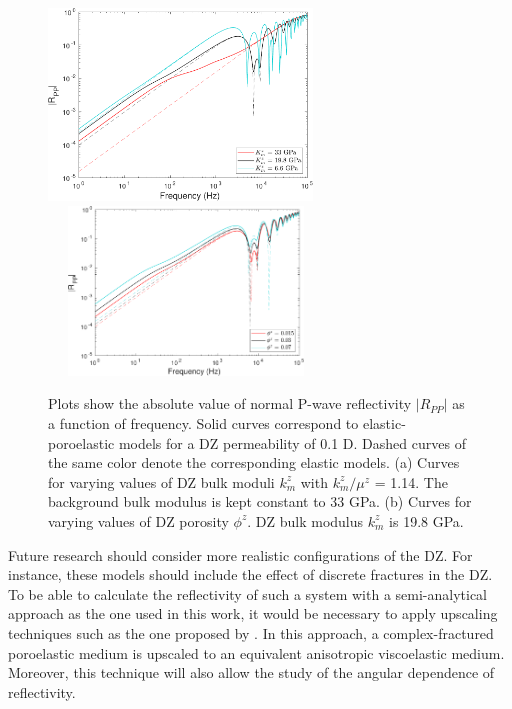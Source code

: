 \documentclass[draft]{agujournal2019}
\begin{document}
\begin{figure}[hp]
\centering
    \subcaptionbox{}
      {
       \includegraphics[width=70mm, height=45 mm]{figures/rt_dz_km_perm1e-1d.pdf}
        }
    \subcaptionbox{}
      {
        \includegraphics[width=73mm, height=45mm]{figures/rt_dz_kmphi_perm1e-1d.pdf}
        }
\caption {
 Plots show the absolute value of normal P-wave reflectivity $|R_{PP}|$ as a function of frequency.
 Solid curves correspond to elastic-poroelastic models for a DZ permeability of 0.1 D. Dashed curves of the same color denote the corresponding elastic models. (a) Curves for varying values of DZ bulk moduli $k_m^z$ with $k_m^z/\mu^z$  = 1.14. The background bulk modulus is kept constant to 33 GPa.
 (b) Curves for varying values of DZ porosity $\phi^z$. DZ bulk modulus $k_m^z$ is 19.8 GPa. }
\label{fig:11}
\end{figure}

Future research should consider more realistic configurations of the DZ. For instance, these models should include the effect of discrete fractures in the DZ. To be able to calculate the reflectivity of such a system with a semi-analytical approach as the one used in this work, it would be necessary to apply upscaling techniques such as the one proposed by . In this approach, a complex-fractured poroelastic medium is upscaled to an equivalent anisotropic viscoelastic medium. Moreover, this technique will also allow the study of the angular dependence of reflectivity.

\end{document}
